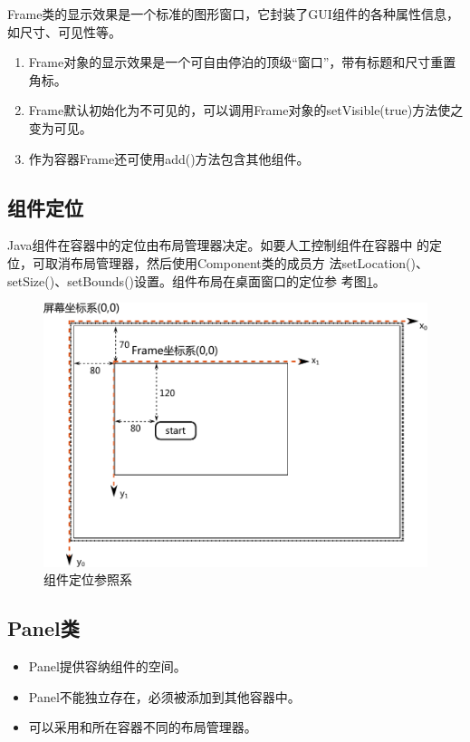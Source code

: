 Frame类的显示效果是一个标准的图形窗口，它封装了GUI组件的各种属性信息，如尺寸、可见性等。

\begin{enumerate}\kai
\item Frame对象的显示效果是一个可自由停泊的顶级“窗口”，带有标题和尺寸重置角标。
\item Frame默认初始化为不可见的，可以调用Frame对象的setVisible(true)方法使之变为可见。
\item 作为容器Frame还可使用add()方法包含其他组件。
\end{enumerate}


\subsection{组件定位}

Java组件在容器中的定位由{\hei 布局管理器}决定。如要人工控制组件在容器中
的定位，可取消布局管理器，然后使用Component类的成员方
法setLocation()、setSize()、setBounds()设置。组件布局在桌面窗口的定位参
考图\ref{fig:fig-AWT-components-location}。

\begin{figure}[htb]
\centering
\includegraphics[width=.7\textwidth]{images/Java-GUI-programming/fig-AWT-components-location.pdf}
\caption{组件定位参照系}
\label{fig:fig-AWT-components-location}
\end{figure}

\subsection{Panel类}

\begin{itemize}
\item Panel提供容纳组件的空间。
\item Panel不能独立存在，必须被添加到其他容器中。
\item 可以采用和所在容器不同的布局管理器。
\end{itemize}

